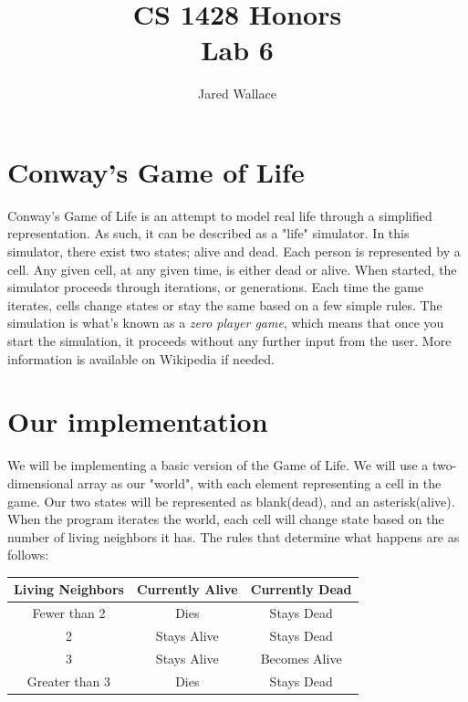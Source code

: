 \documentclass[letterpaper,12pt]{article}
\title{\Large CS 1428 Honors\\Lab 6}
\author{Jared Wallace}
\date{}
\begin{document}
\maketitle

\vspace{30mm}

\section*{Conway's Game of Life}
Conway's Game of Life is an attempt to model real life through a simplified representation.
As such, it can be described as a "life" simulator. In this simulator, there exist two states;
alive and dead. Each person is represented by a cell. Any given cell, at any given time, is either
dead or alive. When started, the simulator proceeds through iterations, or generations. Each time
the game iterates, cells change states or stay the same based on a few simple rules.
The simulation is what's known as a \emph{zero player game}, which means that once you start the
simulation, it proceeds without any further input from the user.
More information is available on Wikipedia if needed.

\section*{Our implementation}
We will be implementing a basic version of the Game of Life. We will use a two-dimensional array as
our "world", with each element representing a cell in the game. Our two states will be represented as
blank(dead), and an asterisk(alive). When the program iterates the world, each cell will change state
based on the number of living neighbors it has. The rules that determine what happens are as follows:
\begin{table}[H]
\begin{center}
    \begin{tabular}{|c|c|c|}
        \hline
        \textbf{Living Neighbors} & \textbf{Currently Alive} & \textbf{Currently Dead} \\ \hline
        Fewer than 2 & Dies & Stays Dead \\ \hline
        2 & Stays Alive & Stays Dead \\ \hline
        3 & Stays Alive & Becomes Alive \\ \hline
        Greater than 3 & Dies & Stays Dead \\ \hline
    \end{tabular}
\end{center}
\end{table}
\end{document}
